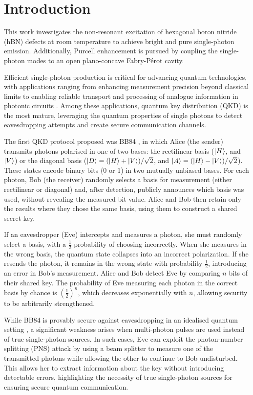 \section{Introduction}

This work investigates the non-resonant excitation of hexagonal boron nitride (hBN) defects at room temperature to achieve bright and pure single-photon emission. Additionally, Purcell enhancement is pursued by coupling the single-photon modes to an open plano-concave Fabry-Pérot cavity.

Efficient single-photon production is critical for advancing quantum technologies, with applications ranging from enhancing measurement precision beyond classical limits \cite{Nagata2007, Vitelli2010} to enabling reliable transport and processing of analogue information in photonic circuits \cite{Bogaerts2020}. Among these applications, quantum key distribution (QKD) is the most mature, leveraging the quantum properties of single photons to detect eavesdropping attempts and create secure communication channels. 

The first QKD protocol proposed was BB84 \cite{Bennett2014}, in which Alice (the sender) transmits photons polarised in one of two bases: the rectilinear basis ($\ket{H}$, and $\ket{V}$) or the diagonal basis ($\ket{D}=(\ket{H}+\ket{V})/\sqrt{2}$, and $\ket{A}=(\ket{H}-\ket{V})/\sqrt{2}$). These states encode binary bits (0 or 1) in two mutually unbiased bases. For each photon, Bob (the receiver) randomly selects a basis for measurement (either rectilinear or diagonal) and, after detection, publicly announces which basis was used, without revealing the measured bit value. Alice and Bob then retain only the results where they chose the same basis, using them to construct a shared secret key.

If an eavesdropper (Eve) intercepts and measures a photon, she must randomly select a basis, with a $ \frac{1}{2} $ probability of choosing incorrectly. When she measures in the wrong basis, the quantum state collapses into an incorrect polarization. If she resends the photon, it remains in the wrong state with probability $ \frac{1}{2} $, introducing an error in Bob’s measurement. Alice and Bob detect Eve by comparing $ n $ bits of their shared key. The probability of Eve measuring each photon in the correct basis by chance is $\left(\frac{1}{2}\right)^n$, which decreases exponentially with $n$, allowing security to be arbitrarily strengthened.

While BB84 is provably secure against eavesdropping in an idealised quantum setting \cite{Shor2000}, a significant weakness arises when multi-photon pulses are used instead of true single-photon sources. In such cases, Eve can exploit the photon-number splitting (PNS) attack \cite{Ashkenazy2024} by using a beam splitter to measure one of the transmitted photons while allowing the other to continue to Bob undisturbed. This allows her to extract information about the key without introducing detectable errors, highlighting the necessity of true single-photon sources for ensuring secure quantum communication.

